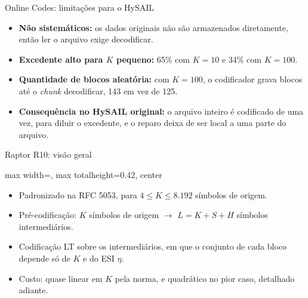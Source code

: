 \documentclass[aspectratio=169,10pt]{beamer}
\newcommand{\figura}[2][0.72]{%
	\begin{adjustbox}{max width=\textwidth, max totalheight=#1\textheight, center}\end{adjustbox}}
\newenvironment{topicos}{\begin{itemize}\setlength{\itemsep}{0.7em}}{\end{itemize}}
\begin{document}
\begin{frame}{Online Codes: limitações para o HySAIL}
	\begin{topicos}
		\item \textbf{Não sistemáticos:} os dados originais não são armazenados diretamente, então ler o arquivo exige decodificar.
		\item \textbf{Excedente alto para $K$ pequeno:} \alert{65\%} com $K = 10$ e \alert{34\%} com $K = 100$.
		\item \textbf{Quantidade de blocos aleatória:} com $K = 100$, o codificador grava blocos até o \emph{chunk} decodificar, \alert{143} em vez de 125.
		\item \textbf{Consequência no HySAIL original:} o arquivo inteiro é codificado de uma vez, para diluir o excedente, e o reparo deixa de ser local a uma parte do arquivo.
	\end{topicos}
\end{frame}

\begin{frame}{Raptor R10: visão geral}
	\figura[0.42]{../thesis/img/tikz/raptor_r10}
	\vfill
	\begin{itemize}\setlength{\itemsep}{0.4em}
		\item Padronizado na \alert{RFC 5053}, para $4 \le K \le 8.192$ símbolos de origem.
		\item Pré-codificação: $K$ símbolos de origem $\rightarrow$ $L = K + S + H$ símbolos intermediários.
		\item Codificação LT sobre os intermediários, em que o conjunto de cada bloco depende só de $K$ e do \alert{ESI} $\eta$.
		\item Custo: \alert{quase linear} em $K$ pela norma, e quadrático no pior caso, detalhado adiante.
	\end{itemize}
\end{frame}
\end{document}

